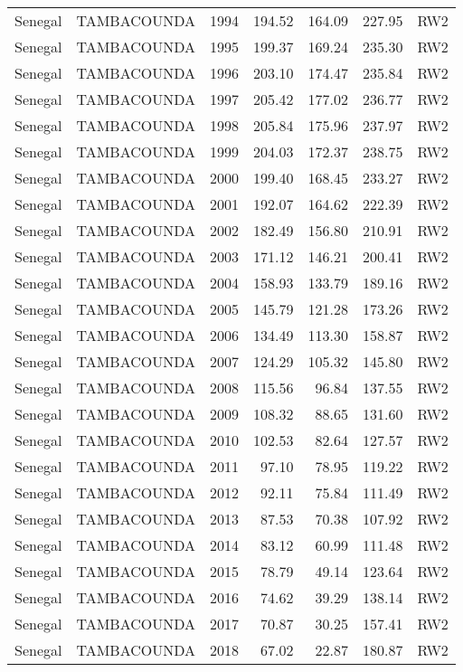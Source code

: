 \begin{longtable}{lllrrrl}
  Senegal & TAMBACOUNDA & 1994 & 194.52 & 164.09 & 227.95 & RW2 \\ 
  Senegal & TAMBACOUNDA & 1995 & 199.37 & 169.24 & 235.30 & RW2 \\ 
  Senegal & TAMBACOUNDA & 1996 & 203.10 & 174.47 & 235.84 & RW2 \\ 
  Senegal & TAMBACOUNDA & 1997 & 205.42 & 177.02 & 236.77 & RW2 \\ 
  Senegal & TAMBACOUNDA & 1998 & 205.84 & 175.96 & 237.97 & RW2 \\ 
  Senegal & TAMBACOUNDA & 1999 & 204.03 & 172.37 & 238.75 & RW2 \\ 
  Senegal & TAMBACOUNDA & 2000 & 199.40 & 168.45 & 233.27 & RW2 \\ 
  Senegal & TAMBACOUNDA & 2001 & 192.07 & 164.62 & 222.39 & RW2 \\ 
  Senegal & TAMBACOUNDA & 2002 & 182.49 & 156.80 & 210.91 & RW2 \\ 
  Senegal & TAMBACOUNDA & 2003 & 171.12 & 146.21 & 200.41 & RW2 \\ 
  Senegal & TAMBACOUNDA & 2004 & 158.93 & 133.79 & 189.16 & RW2 \\ 
  Senegal & TAMBACOUNDA & 2005 & 145.79 & 121.28 & 173.26 & RW2 \\ 
  Senegal & TAMBACOUNDA & 2006 & 134.49 & 113.30 & 158.87 & RW2 \\ 
  Senegal & TAMBACOUNDA & 2007 & 124.29 & 105.32 & 145.80 & RW2 \\ 
  Senegal & TAMBACOUNDA & 2008 & 115.56 & 96.84 & 137.55 & RW2 \\ 
  Senegal & TAMBACOUNDA & 2009 & 108.32 & 88.65 & 131.60 & RW2 \\ 
  Senegal & TAMBACOUNDA & 2010 & 102.53 & 82.64 & 127.57 & RW2 \\ 
  Senegal & TAMBACOUNDA & 2011 & 97.10 & 78.95 & 119.22 & RW2 \\ 
  Senegal & TAMBACOUNDA & 2012 & 92.11 & 75.84 & 111.49 & RW2 \\ 
  Senegal & TAMBACOUNDA & 2013 & 87.53 & 70.38 & 107.92 & RW2 \\ 
  Senegal & TAMBACOUNDA & 2014 & 83.12 & 60.99 & 111.48 & RW2 \\ 
  Senegal & TAMBACOUNDA & 2015 & 78.79 & 49.14 & 123.64 & RW2 \\ 
  Senegal & TAMBACOUNDA & 2016 & 74.62 & 39.29 & 138.14 & RW2 \\ 
  Senegal & TAMBACOUNDA & 2017 & 70.87 & 30.25 & 157.41 & RW2 \\ 
  Senegal & TAMBACOUNDA & 2018 & 67.02 & 22.87 & 180.87 & RW2 \\ 

\end{longtable}
